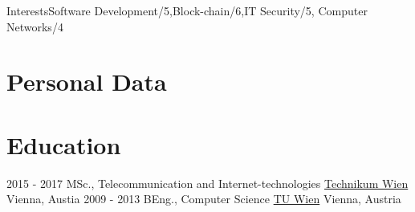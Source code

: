 


{Interests}{{Software Development/5},{Block-chain/6},{IT Security/5}, {Computer Networks/4}}


\section {Personal Data}


\begin{twenty}
\end{twenty}

\section{Education}


\begin{twenty} %
	\twentyitem
    	{2015 - 2017}
        {MSc., Telecommunication and Internet-technologies}
        {\href{https://www.technikum-wien.at/
}{Technikum Wien}}
        {Vienna, Austia}
        {}
	\twentyitem
    	{2009 - 2013}
        {BEng., Computer Science}
        {\href{https://www.tuwien.ac.at/}{TU Wien}}
        {Vienna, Austria}
        {}
\end{twenty}
